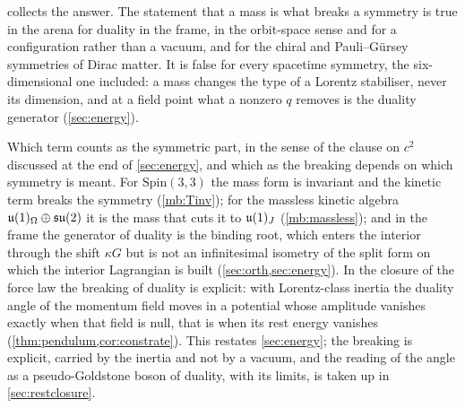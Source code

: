  collects the answer. The statement that a mass is what breaks a symmetry is true in the arena for duality in the
frame, in the orbit-space sense and for a configuration rather than a vacuum, and for the chiral and Pauli--G\"ursey symmetries of Dirac
matter. It is false for every spacetime symmetry, the six-dimensional one included: a mass changes the type of a Lorentz stabiliser, never its
dimension, and at a field point what a nonzero $q$ removes is the duality generator (\cref{sec:energy}).

Which term counts as the symmetric part, in the sense of the clause on $c^2$ discussed at the end of \cref{sec:energy}, and which as the breaking depends on which symmetry is meant. For $\mathrm{Spin}(3,3)$ the mass form is invariant and the
kinetic term breaks the symmetry (\cref{mb:Tinv}); for the massless kinetic algebra $\mathfrak{u}(1)_\Omega\oplus\mathfrak{su}(2)$ it is the mass that cuts it to
$\mathfrak{u}(1)_J$ (\cref{mb:massless}); and in the frame the generator of duality is the binding root, which enters the interior through the shift
$\kappa G$ but is not an infinitesimal isometry of the split form on which the interior Lagrangian is built (\cref{sec:orth,sec:energy}).
In the closure of the force law the breaking of duality is explicit: with Lorentz-class inertia the duality angle of the momentum field
moves in a potential whose amplitude vanishes exactly when that field is null, that is when its rest energy vanishes
(\cref{thm:pendulum,cor:constrate}). This restates \cref{sec:energy}; the breaking is explicit, carried by the inertia and not by a vacuum, and the reading of the angle as a
pseudo-Goldstone boson of duality, with its limits, is taken up in \cref{sec:restclosure}.
